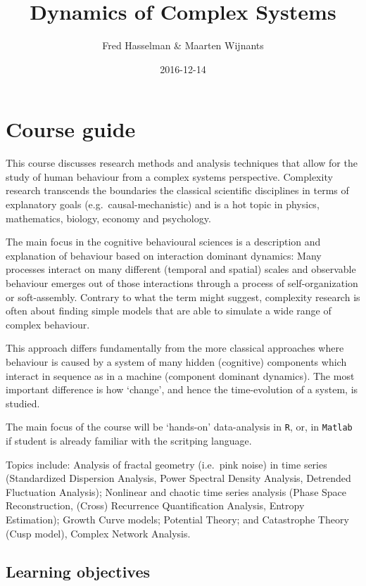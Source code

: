 \documentclass[]{book}
\title{Dynamics of Complex Systems}
\author{Fred Hasselman \& Maarten Wijnants}
\date{2016-12-14}
\let\stdsection\section
\renewcommand\section{\newpage\stdsection}
\begin{document}
\maketitle

{
\setcounter{tocdepth}{1}
\tableofcontents
}
\chapter{\texorpdfstring{\textbf{Course
guide}}{Course guide}}\label{course-guide}

This course discusses research methods and analysis techniques that
allow for the study of human behaviour from a complex systems
perspective. Complexity research transcends the boundaries the classical
scientific disciplines in terms of explanatory goals
(e.g.~causal-mechanistic) and is a hot topic in physics, mathematics,
biology, economy and psychology.

The main focus in the cognitive behavioural sciences is a description
and explanation of behaviour based on interaction dominant dynamics:
Many processes interact on many different (temporal and spatial) scales
and observable behaviour emerges out of those interactions through a
process of self-organization or soft-assembly. Contrary to what the term
might suggest, complexity research is often about finding simple models
that are able to simulate a wide range of complex behaviour.

This approach differs fundamentally from the more classical approaches
where behaviour is caused by a system of many hidden (cognitive)
components which interact in sequence as in a machine (component
dominant dynamics). The most important difference is how `change', and
hence the time-evolution of a system, is studied.

The main focus of the course will be `hands-on' data-analysis in
\texttt{R}, or, in \texttt{Matlab} if student is already familiar with
the scritping language.

Topics include: Analysis of fractal geometry (i.e.~pink noise) in time
series (Standardized Dispersion Analysis, Power Spectral Density
Analysis, Detrended Fluctuation Analysis); Nonlinear and chaotic time
series analysis (Phase Space Reconstruction, (Cross) Recurrence
Quantification Analysis, Entropy Estimation); Growth Curve models;
Potential Theory; and Catastrophe Theory (Cusp model), Complex Network
Analysis.

\section{Learning objectives}\label{learning-objectives}
\end{document}
